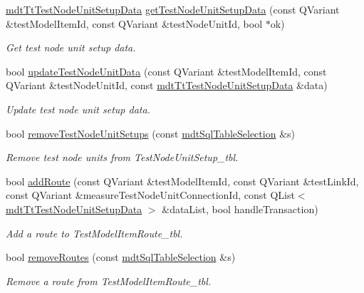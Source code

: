 \begin{DoxyCompactItemize}
\hyperlink{classmdt_tt_test_node_unit_setup_data}{mdt\-Tt\-Test\-Node\-Unit\-Setup\-Data} \hyperlink{classmdt_tt_test_model_item_a70aa4e3eccb99d87a6d7f3774cce5ceb}{get\-Test\-Node\-Unit\-Setup\-Data} (const Q\-Variant \&test\-Model\-Item\-Id, const Q\-Variant \&test\-Node\-Unit\-Id, bool $\ast$ok)
\begin{DoxyCompactList}\small\item\em Get test node unit setup data. \end{DoxyCompactList}\item 
bool \hyperlink{classmdt_tt_test_model_item_a28996ba0b74dc51cebd1e1581cee4500}{update\-Test\-Node\-Unit\-Data} (const Q\-Variant \&test\-Model\-Item\-Id, const Q\-Variant \&test\-Node\-Unit\-Id, const \hyperlink{classmdt_tt_test_node_unit_setup_data}{mdt\-Tt\-Test\-Node\-Unit\-Setup\-Data} \&data)
\begin{DoxyCompactList}\small\item\em Update test node unit setup data. \end{DoxyCompactList}\item 
bool \hyperlink{classmdt_tt_test_model_item_a20d8f2715f35d5ce8c1fba6179e73a52}{remove\-Test\-Node\-Unit\-Setups} (const \hyperlink{classmdt_sql_table_selection}{mdt\-Sql\-Table\-Selection} \&s)
\begin{DoxyCompactList}\small\item\em Remove test node units from Test\-Node\-Unit\-Setup\-\_\-tbl. \end{DoxyCompactList}\item 
bool \hyperlink{classmdt_tt_test_model_item_a6a65e1811e99e59bb9f531e643cbb329}{add\-Route} (const Q\-Variant \&test\-Model\-Item\-Id, const Q\-Variant \&test\-Link\-Id, const Q\-Variant \&measure\-Test\-Node\-Unit\-Connection\-Id, const Q\-List$<$ \hyperlink{classmdt_tt_test_node_unit_setup_data}{mdt\-Tt\-Test\-Node\-Unit\-Setup\-Data} $>$ \&data\-List, bool handle\-Transaction)
\begin{DoxyCompactList}\small\item\em Add a route to Test\-Model\-Item\-Route\-\_\-tbl. \end{DoxyCompactList}\item 
bool \hyperlink{classmdt_tt_test_model_item_acb07969d5c19a22d8f3039f5f8c2010b}{remove\-Routes} (const \hyperlink{classmdt_sql_table_selection}{mdt\-Sql\-Table\-Selection} \&s)
\begin{DoxyCompactList}\small\item\em Remove a route from Test\-Model\-Item\-Route\-\_\-tbl. \end{DoxyCompactList}\item 

\end{DoxyCompactItemize}
